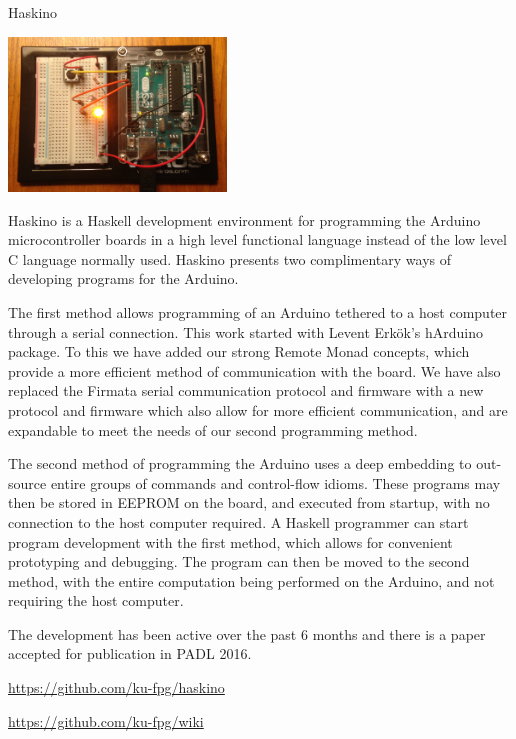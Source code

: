 \begin{hcarentry}{Haskino}
\label{Haskino}
\makeheader

\begin{center}
\includegraphics[width=0.435\textwidth]{html/Arduino.jpg}
\end{center}


Haskino is a Haskell development environment for programming the
Arduino microcontroller boards in a high level functional language
instead of the low level C language normally used.  Haskino presents
two complimentary ways of developing programs for the Arduino.

The first method allows programming of an Arduino tethered to a host
computer through a serial connection.  This work started with Levent
Erk\"{o}k's hArduino package.  To this we have added our strong Remote
Monad concepts, which provide a more efficient method of communication
with the board.  We have also replaced the Firmata serial
communication protocol and firmware with a new protocol and firmware
which also allow for more efficient communication, and are expandable
to meet the needs of our second programming method.

The second method of programming the Arduino uses a deep embedding to
out-source entire groups of commands and control-flow idioms.  These
programs may then be stored in EEPROM on the board, and executed from
startup, with no connection to the host computer required.  A Haskell
programmer can start program development with the first method, which
allows for convenient prototyping and debugging.  The program can then
be moved to the second method, with the entire computation being
performed on the Arduino, and not requiring the host computer.

The development has been active over the past 6 months and there is a
paper accepted for publication in PADL 2016.

\FurtherReading
\begin{compactitem}
\item
  \url{https://github.com/ku-fpg/haskino}
\item
  \url{https://github.com/ku-fpg/wiki}
\end{compactitem}
\end{hcarentry}
